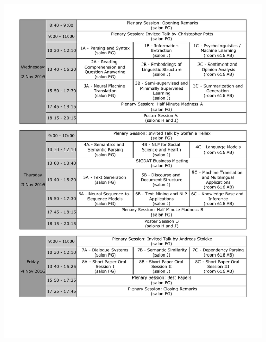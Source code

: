 \normalsize

\clearpage{}
\pagestyle{fancy}

\begin{center}
\includegraphics[width=1\textwidth]{content/overview-main-conference.pdf}
\par\end{center}

\clearpage{}

\small

%
%
%
%

